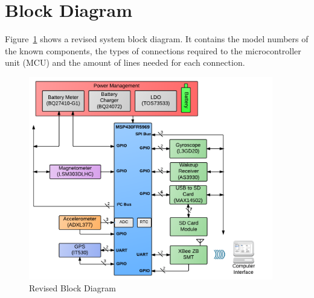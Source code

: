\section{Block Diagram}

Figure~\ref{fig:blockDiagram} shows a revised system block diagram.  It contains the model numbers of the known components, the types of connections required to the microcontroller unit (MCU) and the amount of lines needed for each connection.

\begin{figure}[H]
	\centering
	\includegraphics[width=0.95\textwidth]{img/blockDiagram}
	\caption{Revised Block Diagram \label{fig:blockDiagram}}
\end{figure}

